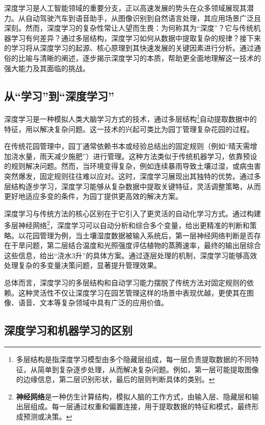 深度学习是人工智能领域的重要分支，正以高速发展的势头在众多领域展现其潜力。从自动驾驶汽车到语音助手，从图像识别到自然语言处理，其应用场景广泛且深刻。然而，深度学习的复杂性常让人望而生畏：为何称其为“深度”？它与传统机器学习有何差异？通过多层结构，深度学习如何从数据中提取复杂的规律？接下来的学习将从深度学习的起源、核心原理到其快速发展的关键因素进行分析。通过通俗的比喻与清晰的阐述，逐步揭示深度学习的本质，帮助更全面地理解这一技术的强大能力及其面临的挑战。

\subsection{从“学习”到“深度学习”}

深度学习是一种模拟人类大脑学习方式的技术，通过多层结构\footnote{多层结构是指深度学习模型由多个隐藏层组成，每一层负责提取数据的不同特征，从简单到复杂逐步处理，从而解决复杂问题。例如，第一层可能提取图像的边缘信息，第二层识别形状，最后的层则判断具体的类别。}自动提取数据中的特征，用以解决复杂问题。这一技术的兴起可类比为园丁管理复杂花园的过程。

在传统花园管理中，园丁通常依赖书本或经验总结出的固定规则（例如“晴天需增加浇水量，雨天减少施肥”）进行管理。这种方法类似于传统机器学习，依靠预设的规则解决问题。然而，当环境变得复杂，例如连续暴雨导致土壤过湿，或病虫害突然爆发，固定规则往往难以应对。这时，深度学习展现出其独特的优势。通过多层结构逐步学习，深度学习能够从复杂数据中提取关键特征，灵活调整策略，从而更好地适应多变的条件，为园丁提供更高效的解决方案。

深度学习与传统方法的核心区别在于它引入了更灵活的自动化学习方式。通过构建多层神经网络\footnote{\textbf{神经网络}是一种仿生计算结构，模拟人脑的工作方式，由输入层、隐藏层和输出层组成。每一层通过权重和偏置连接，用于提取数据的特征和模式，最终形成预测或决策。}，深度学习可以自动分析和综合多个变量，给出更精准的判断和策略。以花园管理为例，当土壤湿度数据被输入系统后，第一层神经网络判断是否存在干旱问题，第二层结合温度和光照强度评估植物的蒸腾速率，最终的输出层综合这些信息，给出“浇水3升”的具体方案。通过逐层处理的机制，深度学习能够高效处理复杂的多变量决策问题，显著提升管理效果。

总体而言，深度学习的多层结构和自动学习能力摆脱了传统方法对固定规则的依赖。这种灵活性不仅让深度学习在园艺管理这样的场景中表现优越，更使其在图像、语音、文本等复杂领域中具有广泛的应用价值。

\subsection{深度学习和机器学习的区别}

